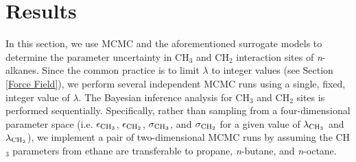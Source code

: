 \documentclass[preprint,letterpaper,floatfix,citeautoscript,aip,jcp]{revtex4-1}
\begin{document}
\section{Results} \label{Results}



%
%
%

In this section, we use MCMC and the aforementioned surrogate models to determine the parameter uncertainty in CH$_3$ and CH$_2$ interaction sites of \textit{n}-alkanes. Since the common practice is to limit $\lambda$ to integer values (see Section \ref{Force Field}), we perform several independent MCMC runs using a single, fixed, integer value of $\lambda$. The Bayesian inference analysis for CH$_3$ and CH$_2$ sites is performed sequentially. Specifically, rather than sampling from a four-dimensional parameter space (i.e. $\epsilon_{\rm CH_3}$, $\epsilon_{\rm CH_2}$, $\sigma_{\rm CH_3}$, and $\sigma_{\rm CH_2}$ for a given value of $\lambda_{\rm CH_3}$ and $\lambda_{\rm CH_2}$), we implement a pair of two-dimensional MCMC runs by assuming the CH$_3$ parameters from ethane are transferable to propane, \textit{n}-butane, and \textit{n}-octane. 
\end{document}
